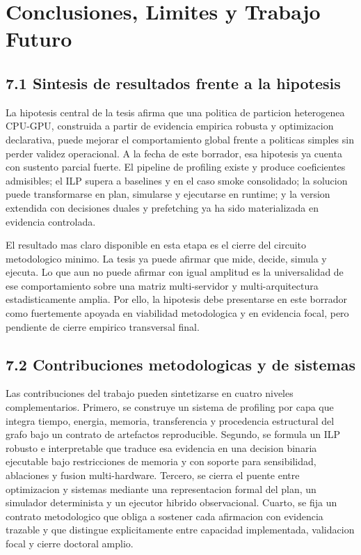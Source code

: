 \chapter{Conclusiones, Limites y Trabajo Futuro}

\section{7.1 Sintesis de resultados frente a la hipotesis}
La hipotesis central de la tesis afirma que una politica de particion heterogenea CPU-GPU, construida a partir de evidencia empirica robusta y optimizacion declarativa, puede mejorar el comportamiento global frente a politicas simples sin perder validez operacional. A la fecha de este borrador, esa hipotesis ya cuenta con sustento parcial fuerte. El pipeline de profiling existe y produce coeficientes admisibles; el ILP supera a baselines  y  en el caso smoke consolidado; la solucion puede transformarse en plan, simularse y ejecutarse en runtime; y la version extendida con decisiones duales y prefetching ya ha sido materializada en evidencia controlada.

El resultado mas claro disponible en esta etapa es el cierre del circuito metodologico minimo. La tesis ya puede afirmar que mide, decide, simula y ejecuta. Lo que aun no puede afirmar con igual amplitud es la universalidad de ese comportamiento sobre una matriz multi-servidor y multi-arquitectura estadisticamente amplia. Por ello, la hipotesis debe presentarse en este borrador como fuertemente apoyada en viabilidad metodologica y en evidencia focal, pero pendiente de cierre empirico transversal final.

\section{7.2 Contribuciones metodologicas y de sistemas}
Las contribuciones del trabajo pueden sintetizarse en cuatro niveles complementarios. Primero, se construye un sistema de profiling por capa que integra tiempo, energia, memoria, transferencia y procedencia estructural del grafo bajo un contrato de artefactos reproducible. Segundo, se formula un ILP robusto e interpretable que traduce esa evidencia en una decision binaria ejecutable bajo restricciones de memoria y con soporte para sensibilidad, ablaciones y fusion multi-hardware. Tercero, se cierra el puente entre optimizacion y sistemas mediante una representacion formal del plan, un simulador determinista y un ejecutor hibrido observacional. Cuarto, se fija un contrato metodologico que obliga a sostener cada afirmacion con evidencia trazable y que distingue explicitamente entre capacidad implementada, validacion focal y cierre doctoral amplio.

